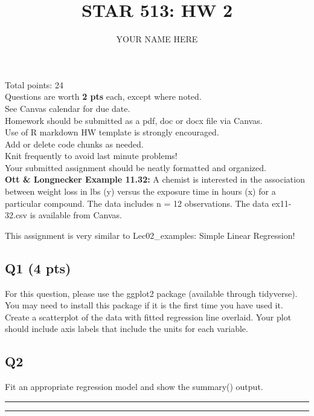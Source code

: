 \documentclass[
]{article}
\title{STAR 513: HW 2}
\author{YOUR NAME HERE}
\date{}
\begin{document}
\maketitle

Total points: 24\\
Questions are worth \textbf{2 pts} each, except where noted.\\
See Canvas calendar for due date.\\

Homework should be submitted as a pdf, doc or docx file via Canvas.\\
Use of R markdown HW template is strongly encouraged.\\
Add or delete code chunks as needed.\\
Knit frequently to avoid last minute problems!\\
Your submitted assignment should be neatly formatted and organized.\\

\textbf{Ott \& Longnecker Example 11.32:} A chemist is interested in the
association between weight loss in lbs (y) versus the exposure time in
hours (x) for a particular compound. The data includes n = 12
observations. The data ex11-32.csv is available from Canvas.

This assignment is very similar to Lec02\_examples: Simple Linear
Regression!

\hypertarget{q1-4-pts}{%
\subsection{Q1 (4 pts)}\label{q1-4-pts}}

For this question, please use the ggplot2 package (available through
tidyverse). You may need to install this package if it is the first time
you have used it. Create a scatterplot of the data with fitted
regression line overlaid. Your plot should include axis labels that
include the units for each variable.

\hypertarget{q2}{%
\subsection{Q2}\label{q2}}

Fit an appropriate regression model and show the summary() output.

\begin{center}\rule{0.5\linewidth}{0.5pt}\end{center}

\begin{center}\rule{0.5\linewidth}{0.5pt}\end{center}
\end{document}
